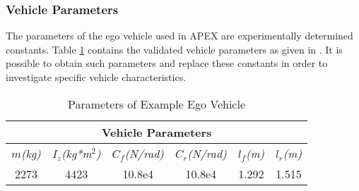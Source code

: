 \subsubsection{Vehicle Parameters}
\label{sect:veh-param}
The parameters of the ego vehicle used in APEX are experimentally determined constants. Table \ref{table:vehiclep} contains the validated vehicle parameters as given in \cite{Althoff2014}. It is possible to obtain such parameters and replace these constants in order to investigate specific vehicle characteristics. 

\begin{table}[h]
	\centering
	\caption{Parameters of Example Ego Vehicle \cite{Althoff2014}}
	\label{table:vehiclep}
	\begin{tabular}{|c|c|c|c|c|c|}
		\hline
		\multicolumn{6}{|c|}{Vehicle Parameters} \\ \hline
		\textit{$m$(kg)} & \textit{$I_z$(kg*m$^2$)} & \textit{$C_f$(N/rad)} & \textit{$C_r$(N/rad)} & \textit{$l_f$(m)} & \textit{$l_r$(m)} \\ \hline
		2273 & 4423 & 10.8e4 & 10.8e4 & 1.292 & 1.515 \\ \hline
	\end{tabular}	
\end{table}